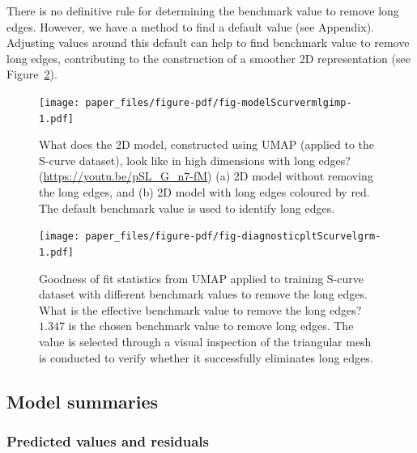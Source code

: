 \documentclass[
  12pt]{article}
\begin{document}
There is no definitive rule for determining the benchmark value to
remove long edges. However, we have a method to find a default value
(see Appendix). Adjusting values around this default can help to find
benchmark value to remove long edges, contributing to the construction
of a smoother 2D representation (see
Figure~\ref{fig-diagnosticpltScurvelgrm}).

\begin{figure}

{\centering \texttt{[image: paper\_files/figure-pdf/fig-modelScurvermlgimp-1.pdf]}

}

\caption{\label{fig-modelScurvermlgimp}What does the 2D model,
constructed using UMAP (applied to the S-curve dataset), look like in
high dimensions with long edges? (\url{https://youtu.be/pSL_G_n7-fM})
(a) 2D model without removing the long edges, and (b) 2D model with long
edges coloured by red. The default benchmark value is used to identify
long edges.}

\end{figure}

\begin{figure}

{\centering \texttt{[image: paper\_files/figure-pdf/fig-diagnosticpltScurvelgrm-1.pdf]}

}

\caption{\label{fig-diagnosticpltScurvelgrm}Goodness of fit statistics
from UMAP applied to training S-curve dataset with different benchmark
values to remove the long edges. What is the effective benchmark value
to remove the long edges? \(1.347\) is the chosen benchmark value to
remove long edges. The value is selected through a visual inspection of
the triangular mesh is conducted to verify whether it successfully
eliminates long edges.}

\end{figure}

\hypertarget{sec-summary}{%
\subsection{Model summaries}\label{sec-summary}}

\hypertarget{predicted-values-and-residuals}{%
\subsubsection{Predicted values and
residuals}\label{predicted-values-and-residuals}}
\end{document}
